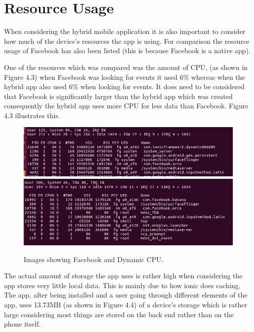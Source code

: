  \section{Resource Usage}
 When considering the hybrid mobile application it is also important to consider how much of the device's resources the app is using. For comparison the resource usage of Facebook has also been listed (this is because Facebook is a native app).

 One of the resources which was compared was the amount of CPU, (as shown in Figure 4.3) when Facebook was looking for events it used 6\% whereas when the hybrid app also used 6\% when looking for events. It does need to be considered that Facebook is significantly larger than the hybrid app which was created consequently the hybrid app uses more CPU for less data than Facebook. Figure 4.3 illustrates this.

\begin{figure}[H]
\includegraphics[scale=0.45]{images/ram2}
\includegraphics[scale=0.45]{images/ram3}
\caption{Images showing Facebook and Dynamic CPU.}
\end{figure}

The actual amount of storage the app uses is rather high when considering the app stores very little local data. This is mainly due to how ionic does caching. The app, after being installed and a user going through different elements of the app, uses 13.73MB (as shown in Figure 4.4) of a device's storage which is rather large considering most things are stored on the back end rather than on the phone itself. 

